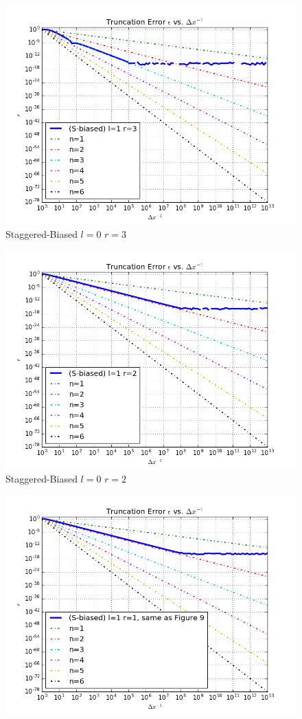 \documentclass[12pt]{article}
\newenvironment{problem}[2][Problem]{\begin{trivlist}
\item[\hskip \labelsep {\bfseries #1}\hskip \labelsep {\bfseries #2.}]}{\end{trivlist}}
\begin{document}
\begin{problem}{1}
\begin{figure}
  \includegraphics[scale=0.5]{sbl1r3}
 \caption{Staggered-Biased $l = 0$ $r = 3$}
\label{label}
\end{figure}
\begin{figure}
\centering
  \includegraphics[scale=0.5]{sbl1r2}
 \caption{Staggered-Biased $l = 0$ $r = 2$}
\label{label}
\end{figure}
\begin{figure}
\centering
  \includegraphics[scale=0.5]{sbl1r1}

\end{figure}
\end{problem}
\end{document}
